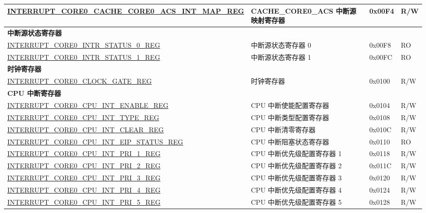 \begin{longtable}{ | p{10cm} | m{10cm} | m{1.3cm} | m{1.0cm} | }
\hyperref[regdesc:INTERRUPTCORE0CACHECORE0ACSINTMAPREG]{INTERRUPT\_CORE0\_CACHE\_CORE0\_ACS\_INT\_MAP\_REG} & CACHE\_CORE0\_ACS 中断源映射寄存器 & 0x00F4 & R/W \\ \hline
\multicolumn{4}{|l|}{\textbf{中断源状态寄存器}} \\ \hline
\hyperref[regdesc:INTERRUPTCORE0INTRSTATUS0REG]{INTERRUPT\_CORE0\_INTR\_STATUS\_0\_REG} & 中断源状态寄存器 0 & 0x00F8 & RO \\ \hline
\hyperref[regdesc:INTERRUPTCORE0INTRSTATUS1REG]{INTERRUPT\_CORE0\_INTR\_STATUS\_1\_REG} & 中断源状态寄存器 1 & 0x00FC & RO \\ \hline
\multicolumn{4}{|l|}{\textbf{时钟寄存器}} \\ \hline
\hyperref[regdesc:INTERRUPTCORE0CLOCKGATEREG]{INTERRUPT\_CORE0\_CLOCK\_GATE\_REG} & 时钟寄存器 & 0x0100 & R/W \\ \hline
\multicolumn{4}{|l|}{\textbf{CPU 中断寄存器}} \\ \hline
\hyperref[regdesc:INTERRUPTCORE0CPUINTENABLEREG]{INTERRUPT\_CORE0\_CPU\_INT\_ENABLE\_REG} & CPU 中断使能配置寄存器 & 0x0104 & R/W \\ \hline
\hyperref[regdesc:INTERRUPTCORE0CPUINTTYPEREG]{INTERRUPT\_CORE0\_CPU\_INT\_TYPE\_REG} & CPU 中断类型配置寄存器 & 0x0108 & R/W \\ \hline
\hyperref[regdesc:INTERRUPTCORE0CPUINTCLEARREG]{INTERRUPT\_CORE0\_CPU\_INT\_CLEAR\_REG} & CPU 中断清零寄存器 & 0x010C & R/W \\ \hline
\hyperref[regdesc:INTERRUPTCORE0CPUINTEIPSTATUSREG]{INTERRUPT\_CORE0\_CPU\_INT\_EIP\_STATUS\_REG} & CPU 中断阻塞状态寄存器 & 0x0110 & RO \\ \hline
\hyperref[regdesc:INTERRUPTCORE0CPUINTPRI0REG]{INTERRUPT\_CORE0\_CPU\_INT\_PRI\_1\_REG} & CPU 中断优先级配置寄存器 1 & 0x0118 & R/W \\ \hline
\hyperref[regdesc:INTERRUPTCORE0CPUINTPRI0REG]{INTERRUPT\_CORE0\_CPU\_INT\_PRI\_2\_REG} & CPU 中断优先级配置寄存器 2  & 0x011C & R/W \\ \hline
\hyperref[regdesc:INTERRUPTCORE0CPUINTPRI0REG]{INTERRUPT\_CORE0\_CPU\_INT\_PRI\_3\_REG} & CPU 中断优先级配置寄存器 3 & 0x0120 & R/W \\ \hline
\hyperref[regdesc:INTERRUPTCORE0CPUINTPRI0REG]{INTERRUPT\_CORE0\_CPU\_INT\_PRI\_4\_REG} & CPU 中断优先级配置寄存器 4 & 0x0124 & R/W \\ \hline
\hyperref[regdesc:INTERRUPTCORE0CPUINTPRI0REG]{INTERRUPT\_CORE0\_CPU\_INT\_PRI\_5\_REG} & CPU 中断优先级配置寄存器 5 & 0x0128 & R/W \\ \hline

\end{longtable}
